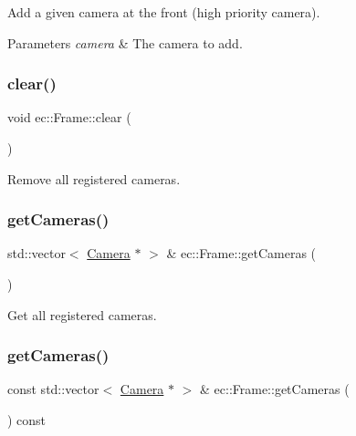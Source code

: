 Add a given camera at the front (high priority camera). 


\begin{DoxyParams}{Parameters}
{\em camera} & The camera to add. \\
\hline
\end{DoxyParams}
\mbox{\label{classec_1_1_frame_ae9896c9acff0f468a750d9eae784b23b}} 
\subsubsection{\texorpdfstring{clear()}{clear()}}
{\footnotesize\ttfamily void ec\+::\+Frame\+::clear (\begin{DoxyParamCaption}{ }\end{DoxyParamCaption})}



Remove all registered cameras. 

\mbox{\label{classec_1_1_frame_a942b4c8826f6169703ff6b19ae60be8c}} 
\subsubsection{\texorpdfstring{get\+Cameras()}{getCameras()}\hspace{0.1cm}{\footnotesize\ttfamily [1/2]}}
{\footnotesize\ttfamily std\+::vector$<$ \mbox{\hyperlink{classec_1_1_camera}{Camera}} $\ast$ $>$ \& ec\+::\+Frame\+::get\+Cameras (\begin{DoxyParamCaption}{ }\end{DoxyParamCaption})}



Get all registered cameras. 

\mbox{\label{classec_1_1_frame_a80aefbcba8339fabc3b4aa2b8b21a8bf}} 
\subsubsection{\texorpdfstring{get\+Cameras()}{getCameras()}\hspace{0.1cm}{\footnotesize\ttfamily [2/2]}}
{\footnotesize\ttfamily const std\+::vector$<$ \mbox{\hyperlink{classec_1_1_camera}{Camera}} $\ast$ $>$ \& ec\+::\+Frame\+::get\+Cameras (\begin{DoxyParamCaption}{ }\end{DoxyParamCaption}) const}



